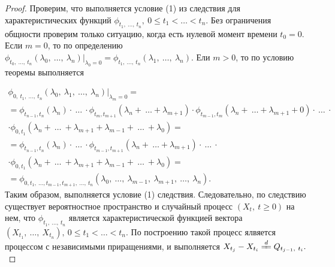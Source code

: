 \begin{proof}
Проверим, что выполняется условие (1) из следствия для характеристических функций $\displaystyle \phi _{t_{1} ,\ \dotsc ,\ t_{n}} ,\ 0\leqslant t_{1} < \dotsc < t_{n}$. Без ограничения общности проверим только ситуацию, когда есть нулевой момент времени $\displaystyle t_{0} =0$. Если $\displaystyle m=0$, то по определению $\displaystyle \phi _{t_{0} ,\ \dotsc ,\ t_{n}}( \lambda _{0} ,\ \dotsc ,\ \lambda _{n}) \big\rvert_{\lambda _{0} =0} =\phi _{t_{1} ,\ \dotsc ,\ t_{n}}( \lambda _{1} ,\ \dotsc ,\ \lambda _{n})$. Ели $\displaystyle m >0$, то по условию теоремы выполняется

\begin{gather*}
\phi _{0,\ t_{1} ,\ \dotsc ,\ t_{n}}( \lambda _{0} ,\ \lambda _{1} ,\ \dotsc ,\ \lambda _{n}) \big\rvert_{\lambda _{m} =0} =\\
=\phi _{t_{n-1} ,t_{n}}( \lambda _{n}) \cdotp \ \dotsc \ \cdotp \phi _{t_{m} ,t_{m+1}}( \lambda _{n} +\ \dotsc +\lambda _{m+1}) \cdotp \phi _{t_{m-1} ,t_{m}}( \lambda _{n} +\ \dotsc +\lambda _{m+1} +0) \cdotp \ \dotsc \ \cdotp \\
\cdotp \phi _{0,t_{1}}( \lambda _{n} +\ \dotsc \ +\lambda _{m+1} +\lambda _{m-1} +\ \dotsc \ +\lambda _{0}) =\\
=\phi _{t_{n-1} ,t_{n}}( \lambda _{n}) \cdotp \ \dotsc \ \cdotp \phi _{t_{m-1} ,t_{m+1}}( \lambda _{n} +\ \dotsc +\lambda _{m+1}) \cdotp \ \dotsc \ \cdotp \\
\cdotp \phi _{0,t_{1}}( \lambda _{n} +\ \dotsc \ +\lambda _{m+1} +\lambda _{m-1} +\ \dotsc \ +\lambda _{0}) =\\
=\phi _{0,t_{1} ,\ \dotsc ,t_{m-1} ,t_{m+1} ,\ \dotsc ,\ t_{n}}( \lambda _{0} ,\ \dotsc ,\ \lambda _{m-1} ,\ \lambda _{m+1} ,\ \dotsc ,\ \lambda _{n}) .
\end{gather*}
Таким образом, выполняется условие (1) следствия. Следовательно, по следствию существует вероятностное пространство и случайный процесс $\displaystyle ( X_{t} ,\ t\geqslant 0)$ на нем, что $\displaystyle \phi _{t_{1} ,\ \dotsc ,\ t_{n}}$ является характеристической функцией вектора $\displaystyle ( X_{t_{1}} ,\ \dotsc ,\ X_{t_{n}}) ,\ 0\leqslant t_{1} < \dotsc < t_{n}$. По построению такой процесс ялвяется процессом с независимыми приращениями, и выполняется $\displaystyle X_{t_{j}} -X_{t_{i}}\xlongequal{d} Q_{t_{j-1} ,\ t_{i}} .$
\end{proof}
